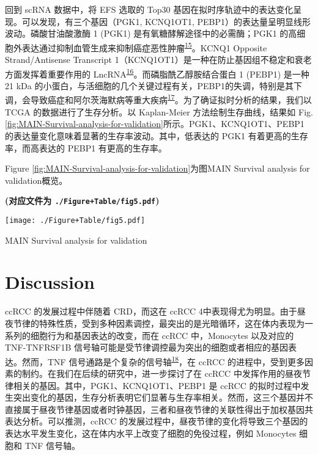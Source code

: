 \documentclass[
]{article}
\begin{document}
回到 scRNA 数据中，将 EFS 选取的 Top30 基因在拟时序轨迹中的表达变化呈现。可以发现，有三个基因（PGK1, KCNQ1OT1, PEBP1）的表达量呈明显线形波动。磷酸甘油酸激酶 1 (PGK1) 是有氧糖酵解途径中的必需酶；PGK1 的高细胞外表达通过抑制血管生成来抑制癌症恶性肿瘤\textsuperscript{\protect\hyperlink{ref-Pgk1MediatedCHeYu2019}{15}}。KCNQ1 Opposite Strand/Antisense Transcript 1（KCNQ1OT1）是一种在防止基因组不稳定和衰老方面发挥着重要作用的 LncRNA\textsuperscript{\protect\hyperlink{ref-Kcnq1ot1PromotZhang2022}{16}}。而磷脂酰乙醇胺结合蛋白 1 (PEBP1) 是一种 21 kDa 的小蛋白，与活细胞的几个关键过程有关，PEBP1的失调，特别是其下调，会导致癌症和阿尔茨海默病等重大疾病\textsuperscript{\protect\hyperlink{ref-Pebp1RkipBehaSchoen2020}{17}}。为了确证拟时分析的结果，我们以 TCGA 的数据进行了生存分析。以 Kaplan-Meier 方法绘制生存曲线，结果如 Fig. \ref{fig:MAIN-Survival-analysis-for-validation}所示。PGK1、KCNQ1OT1、PEBP1 的表达量变化意味着显著的生存率波动。其中，低表达的 PGK1 有着更高的生存率，而高表达的 PEBP1 有更高的生存率。

Figure \ref{fig:MAIN-Survival-analysis-for-validation}为图MAIN Survival analysis for validation概览。

\textbf{(对应文件为 \texttt{./Figure+Table/fig5.pdf})}

\def\@captype{figure}
\begin{center}
\texttt{[image: ./Figure+Table/fig5.pdf]}
\caption{MAIN Survival analysis for validation}\label{fig:MAIN-Survival-analysis-for-validation}
\end{center}

\hypertarget{discussion}{%
\section{Discussion}\label{discussion}}

ccRCC 的发展过程中伴随着 CRD，而这在 ccRCC 4中表现得尤为明显。由于昼夜节律的特殊性质，受到多种因素调控，最突出的是光暗循环，这在体内表现为一系列的细胞行为和基因表达的改变，而在 ccRCC 中，Monocytes 以及对应的 TNF-TNFRSF1B 信号轴可能是受节律调控最为突出的细胞或者相应的基因表达。然而，TNF 信号通路是个复杂的信号轴\textsuperscript{\protect\hyperlink{ref-TnfInTheEraChen2021}{18}}，在 ccRCC 的进程中，受到更多因素的制约。在我们在后续的研究中，进一步探讨了在 ccRCC 中发挥作用的昼夜节律相关的基因。其中，PGK1、KCNQ1OT1、PEBP1 是 ccRCC 的拟时过程中发生突出变化的基因，生存分析表明它们显著与生存率相关。然而，这三个基因并不直接属于昼夜节律基因或者时钟基因，三者和昼夜节律的关联性得出于加权基因共表达分析。可以推测，ccRCC 的发展过程中，昼夜节律的变化将导致三个基因的表达水平发生变化，这在体内水平上改变了细胞的免役过程，例如 Monocytes 细胞和 TNF 信号轴。
\end{document}
